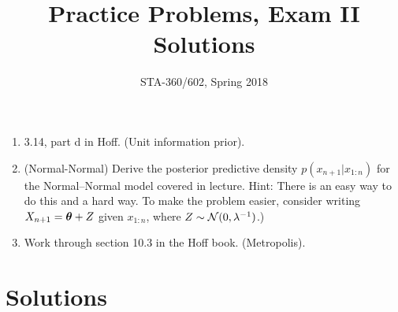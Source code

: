 \documentclass{article}
\begin{document}
\title{Practice Problems, Exam II Solutions}
\author{STA-360/602, Spring 2018}
\maketitle


\begin{enumerate}
\item 3.14, part d in Hoff. (Unit information prior). 
\item (Normal-Normal)  Derive the posterior predictive density $p(x_{n +1}|x_{1:n})$ for the Normal--Normal model covered in lecture. Hint: There is an easy way to do this and a hard way. To make the problem easier, consider writing $X_{n+1} = {\bm\theta} + Z$ given $x_{1:n}$, where $Z\sim\mathcal{N}(0,\lambda^{-1})$.)
\item Work through section 10.3 in the Hoff book. (Metropolis). 
\end{enumerate}

\section{Solutions}
\end{document}
